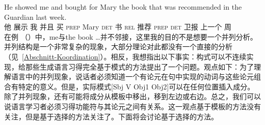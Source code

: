 \ea
\gll He showed me and bought for Mary the book that was recommended in the Guardian last week.\\
    他 展示 我 并且 买 \textsc{prep} Mary \textsc{det} 书 \textsc{rel} \passivepst{} 推荐 \textsc{prep} \textsc{det} 卫报 上一个 周\\
\z
在例 （）中，me与the book \ldots{}并不邻接，这里我的目的不是想要一个并列分析。并列结构是一个非常复杂的现象，大部分理论对此都没有一个直接的分析（见~\ref{Abschnitt-Koordination}）。相反，我想指出以下事实：构式可以不连续实现，给那些生成语言习得完全基于模式的方法提出了一个问题。观点如下：为了理解语言中的并列现象，说话者必须知道一个有论元在句中实现的动词与这些论元组合有特定的意义。但是，实际模式[Sbj V Obj1 Obj2]可以在任何位置插入成分。除了并列现象，还有可能将成分从模板中移出，移到左边或右边。总之，我们可以说语言学习者必须习得功能符与其论元之间有关系。这一观点基于模板的方法没有关注，但是基于选择的方法关注了。下面将会讨论基于选择的方法。


